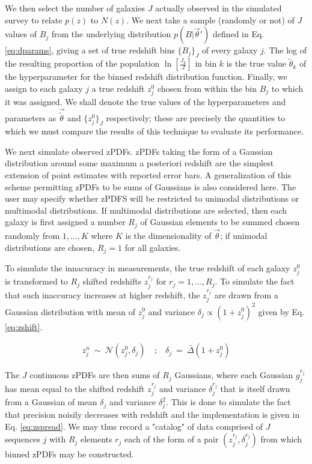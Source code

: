 \documentclass[preprint]{aastex}
\begin{document}
We then select the number of galaxies $J$ actually observed in the simulated survey to relate $p(z)$ to $N(z)$.  We next take a sample (randomly or not) of $J$ values of $B_{j}$ from the underlying distribution $p(B|\vec{\theta}')$ defined in Eq. \ref{eq:dparams}, giving a set of true redshift bins $\{B_{j}\}_{J}$ of every galaxy $j$.  The log of the resulting proportion of the population $\ln[\frac{J_{k}}{J}]$ in bin $k$ is the true value $\tilde{\theta}_{k}$ of the hyperparameter for the binned redshift distribution function.  Finally, we assign to each galaxy $j$ a true redshift $z_{j}^{0}$ chosen from within the bin $B_{j}$ to which it was assigned.  We shall denote the true values of the hyperparameters and parameters as $\vec{\tilde{\theta}}$ and $\{z_{j}^{0}\}_{J}$ respectively; these are precisely the quantities to which we must compare the results of this technique to evaluate its performance.

We next simulate observed zPDFs.  zPDFs taking the form of a Gaussian distribution around some maximum a posteriori redshift are the simplest extension of point estimates with reported error bars.  A generalization of this scheme permitting zPDFs to be sums of Gaussians is also considered here.  The user may specify whether zPDFS will be restricted to unimodal distributions or multimodal distributions.  If multimodal distributions are selected, then each galaxy is first assigned a number $R_{j}$ of Gaussian elements to be summed chosen randomly from $1,\dots,K$ where $K$ is the dimensionality of $\vec{\theta}$; if unimodal distributions are chosen, $R_{j}=1$ for all galaxies.  

To simulate the innacuracy in measurements, the true redshift of each galaxy $z_{j}^{0}$ is transformed to $R_{j}$ shifted redshifts $z^{r_{j}}_{j}$ for $r_{j}=1,\dots,R_{j}$.  To simulate the fact that such inaccuracy increases at higher redshift, the $z^{r_{j}}_{j}$ are drawn from a Gaussian distribution with mean of $z_{j}^{0}$ and variance $\delta_{j}\propto(1+z_{j}^{0})^{2}$ given by Eq. \ref{eq:zshift}.  

\begin{eqnarray}
\label{eq:zshift}
z^{n}_{j}\ \sim\ \mathcal{N}(z_{j}^{0},\delta_{j})\ &;&\ \delta_{j}\ =\ \bar{\Delta}(1+z^{0}_{j})
\end{eqnarray}

The $J$ continuous zPDFs are then sums of $R_{j}$ Gaussians, where each Gaussian $g_{j}^{r_{j}}$ has mean equal to the shifted redshift $z^{r_{j}}_{j}$ and variance $\delta^{r_{j}}_{j}$ that is itself drawn from a Gaussian of mean $\delta_{j}$ and variance $\delta_{j}^{2}$.  This is done to simulate the fact that precision noisily decreases with redshift and the implementation is given in Eq. \ref{eq:zspread}.  We may thus record a "catalog" of data comprised of $J$ sequences $j$ with $R_{j}$ elements $r_{j}$ each of the form of a pair $(z^{r_{j}}_{j},\delta^{r_{j}}_{j})$ from which binned zPDFs may be constructed.  
\end{document}
